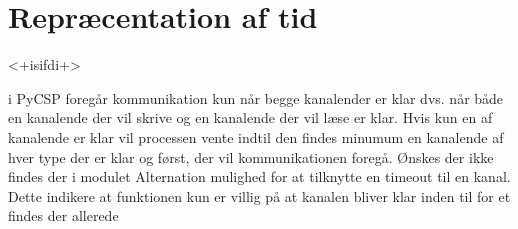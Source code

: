 \section{Repræcentation af tid}<+isifdi+>

i PyCSP foregår kommunikation kun når begge kanalender er klar dvs. når både 
en kanalende der vil
skrive og en kanalende der vil læse er klar. Hvis kun en af kanalende er
klar vil processen vente indtil den findes minumum en kanalende af hver type 
der er klar og først, der vil kommunikationen foregå. Ønskes der ikke  findes 
der i modulet Alternation
mulighed for at tilknytte en timeout til en kanal. Dette indikere at
funktionen kun er villig på at kanalen bliver klar inden til for et
findes der allerede 
